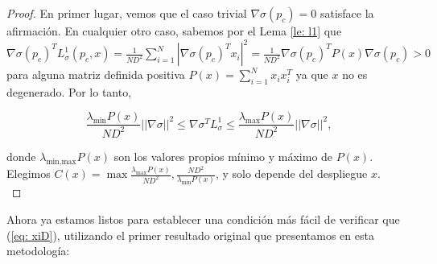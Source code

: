 \begin{proof}
En primer lugar, vemos que el caso trivial $\nabla\sigma(p_c) = 0$ satisface la afirmación. En cualquier otro caso, sabemos por el Lema \ref{le: l1} que $\nabla\sigma(p_c)^TL^1_\sigma(p_c, x) = \frac{1}{ND^2}\sum_{i=1}^N |\nabla\sigma(p_c)^Tx_i|^2 = \frac{1}{ND^2} \nabla\sigma(p_c)^T P(x) \nabla\sigma(p_c) > 0$ para alguna matriz definida positiva $P(x) = \sum_{i=1}^N x_ix_i^T$ ya que $x$ no es degenerado. Por lo tanto,

\begin{equation}
\frac{\lambda_{\text{min}}{P(x)}}{ND^2} || \nabla \sigma ||^2 \le \nabla\sigma^T L^1_\sigma \le \frac{\lambda_{\text{max}}{P(x)}}{ND^2} || \nabla \sigma ||^2, \nonumber
\end{equation}

donde $\lambda_{\text{{min,max}}}{P(x)}$ son los valores propios mínimo y máximo de $P(x)$. Elegimos $C(x) = \max{ \frac{\lambda_{\text{max}}{P(x)}}{ND^2}, \frac{ND^2}{\lambda_{\text{min}}{P(x)}} }$, y solo depende del despliegue $x$.\\

\end{proof}

Ahora ya estamos listos para establecer una condición más fácil de verificar que (\ref{eq: xiD}), utilizando el primer resultado original que presentamos en esta metodología:

\vspace{0.2cm}

